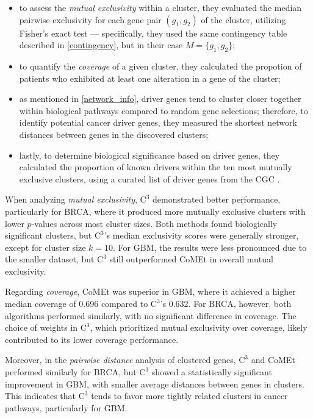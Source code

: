 \begin{itemize}
    \item to assess the \textit{mutual exclusivity} within a cluster, they evaluated the median pairwise exclusivity for each gene pair $(g_1, g_2)$ of the cluster, utilizing Fisher's exact test --- specifically, they used the same contingency table described in \cref{contingency}, but in their case $M = \{g_1, g_2\}$;
    \item to quantify the \textit{coverage} of a given cluster, they calculated the propotion of patients who exhibited at least one alteration in a gene of the cluster;
    \item as mentioned in \cref{network_info}, driver genes tend to cluster closer together within biological pathways compared to random gene selections; therefore, to identify potential cancer driver genes, they measured the shortest network distances between genes in the discovered clusters;
    \item lastly, to determine biological significance based on driver genes, they calculated the proportion of known drivers within the ten most mutually exclusive clusters, using a curated list of driver genes from the CGC \cite{cgc}.
\end{itemize}

When analyzing \textit{mutual exclusivity}, $\mathrm{C}^3$ demonstrated better performance, particularly for BRCA, where it produced more mutually exclusive clusters with lower $p$-values across most cluster sizes. Both methods found biologically significant clusters, but $\mathrm{C}^3$'s median exclusivity scores were generally stronger, except for cluster size $k = 10$. For GBM, the results were less pronounced due to the smaller dataset, but $\mathrm{C}^3$ still outperformed CoMEt in overall mutual exclusivity.

Regarding \textit{coverage}, CoMEt was superior in GBM, where it achieved a higher median coverage of 0.696 compared to $\mathrm{C}^3$'s 0.632. For BRCA, however, both algorithms performed similarly, with no significant difference in coverage. The choice of weights in $\mathrm{C}^3$, which prioritized mutual exclusivity over coverage, likely contributed to its lower coverage performance.

Moreover, in the \textit{pairwise distance} analysis of clustered genes, $\mathrm{C}^3$ and CoMEt performed similarly for BRCA, but $\mathrm{C}^3$ showed a statistically significant improvement in GBM, with smaller average distances between genes in clusters. This indicates that $\mathrm{C}^3$ tends to favor more tightly related clusters in cancer pathways, particularly for GBM.

